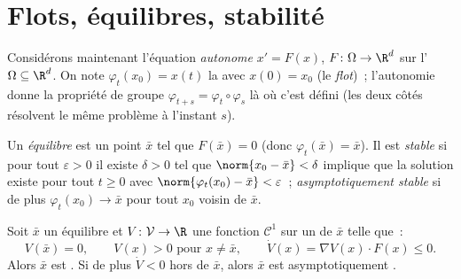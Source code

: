 \section{Flots, équilibres, stabilité}

Considérons maintenant l'équation \emph{autonome}
$x' = F(x)$, $F \colon \Omega \to \R^d$  sur l' $\Omega \subseteq \R^d$. On note
$\varphi_t(x_0) = x(t)$ la  avec $x(0) =
x_0$ (le \emph{flot})~;
l'autonomie donne la propriété de groupe $\varphi_{t+s} =
\varphi_t\circ\varphi_s$ là où c'est défini (les deux côtés
résolvent le même problème à l'instant $s$).

\begin{definition}\label{def:b3:ode:stability}
Un \emph{équilibre} est un point $\bar x$ tel que $F(\bar x)
= 0$ (donc $\varphi_t(\bar x) = \bar x$). Il est
\emph{stable} si pour tout
$\varepsilon > 0$ il existe $\delta > 0$ tel que
$\norm{x_0 - \bar x} < \delta$ implique que la solution
existe pour tout $t \geq 0$ avec $\norm{\varphi_t(x_0) - \bar
x} < \varepsilon$~; \emph{asymptotiquement stable} si de plus
$\varphi_t(x_0) \to \bar x$ pour tout $x_0$ voisin de $\bar
x$.
\end{definition}

\begin{theorem}\label{thm:b3:ode:lyapunov}
Soit $\bar x$ un équilibre et $V \colon \mathcal V \to \R$
une fonction $\mathcal C^1$ sur un  de $\bar x$
telle que~:
\[
V(\bar x) = 0,\qquad V(x) > 0 \text{ pour } x \neq \bar x,
\qquad \dot V(x) = \nabla V(x)\cdot F(x) \leq 0 .
\]
Alors $\bar x$ est . Si de plus $\dot V < 0 $ hors de
$\bar x$, alors $\bar x$ est asymptotiquement .
\end{theorem}

